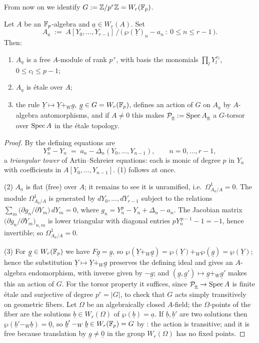 \documentclass[11pt]{article}
\newcommand{\wv}[1]{\underline{#1}}                 %
\begin{document}
From now on we identify $G:=\mathbb{Z}/p^r\mathbb{Z}=W_r(\mathbb{F}_p)$.

\begin{prop}\label{prop:etale}
Let $A$ be an $\mathbb{F}_p$-algebra and $\wv a\in W_r(A)$.  Set
\[
A_{\wv a}\;:=\;A[Y_0,\dots,Y_{r-1}]\,/\,
\big(\,\wp(\wv Y)_n-a_n\ :\ 0\le n\le r-1\,\big).
\]
Then:
\begin{enumerate}
  \item $A_{\wv a}$ is a free $A$-module of rank $p^{\,r}$, with basis the
        monomials $\prod_l Y_l^{\,c_l}$, $0\le c_l\le p-1$;
  \item $A_{\wv a}$ is \'etale over $A$;
  \item the rule $\wv Y\mapsto\wv Y+_W\wv g$, $\wv g\in G=W_r(\F_p)$,
        defines an action of $G$ on $A_{\wv a}$ by $A$-algebra
        automorphisms, and if $A\ne 0$ this makes
        $\cP_{\wv a}:=\Spec A_{\wv a}$ a $G$-torsor over $\operatorname{Spec} A$ in the
        \'etale topology.
\end{enumerate}
\end{prop}

\begin{proof}
By  the defining equations are
\[
Y_n^{\,p}-Y_n \;=\; a_n-\Delta_n(Y_0,\dots,Y_{n-1}),\qquad n=0,\dots,r-1,
\]
a \emph{triangular tower} of Artin--Schreier equations: each is monic of
degree $p$ in $Y_n$ with coefficients in
$A[Y_0,\dots,Y_{n-1}]$.  (1) follows at once.

(2) $A_{\wv a}$ is flat (free) over $A$; it remains to see it is
unramified, i.e.\ $\Omega^1_{A_{\wv a}/A}=0$.  The module
$\Omega^1_{A_{\wv a}/A}$ is generated by $dY_0,\dots,dY_{r-1}$ subject to
the relations $\sum_m\big(\partial g_n/\partial Y_m\big)\,dY_m=0$, where
$g_n=Y_n^p-Y_n+\Delta_n-a_n$.  The Jacobian matrix
$\big(\partial g_n/\partial Y_m\big)_{n,m}$ is lower triangular with
diagonal entries $pY_n^{\,p-1}-1=-1$, hence invertible; so
$\Omega^1_{A_{\wv a}/A}=0$.

(3) For $\wv g\in W_r(\F_p)$ we have $F\wv g=\wv g$, so
$\wp(\wv Y+_W\wv g)=\wp(\wv Y)+_W\wp(\wv g)=\wp(\wv Y)$; hence the
substitution $\wv Y\mapsto\wv Y+_W\wv g$ preserves the defining ideal
and gives an $A$-algebra endomorphism, with inverse given by $-\wv g$; and
$(\wv g,\wv g')\mapsto\wv g+_W\wv g'$ makes this an action of $G$.
For the torsor property it suffices, since $\cP_{\wv a}\to\Spec A$ is
finite \'etale and surjective of degree $p^r=|G|$, to check that $G$ acts
simply transitively on geometric fibers.  Let $\Omega$ be an algebraically
closed $A$-field; the $\Omega$-points of the fiber are the solutions
$\wv b\in W_r(\Omega)$ of $\wp(\wv b)=\wv a$.  If $\wv b,\wv b'$ are two
solutions then $\wp(\wv b'-_W\wv b)=\wv 0$, so
$\wv b'-_W\wv b\in W_r(\F_p)=G$ by : the action is
transitive; and it is free because translation by $\wv g\ne\wv 0$ in the
group $W_r(\Omega)$ has no fixed points.
\end{proof}
\end{document}
